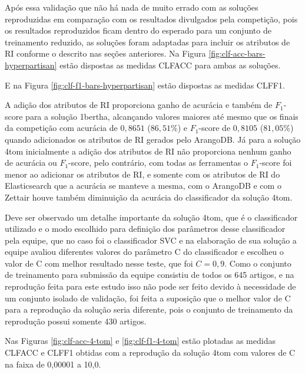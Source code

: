 			

			Após essa validação que não há nada de muito errado com as soluções reproduzidas em comparação com os resultados divulgados pela competição, pois os resultados reproduzidos ficam dentro do esperado para um conjunto de treinamento reduzido, as soluções foram adaptadas para incluir os atributos de RI conforme o descrito nas seções anteriores.
			Na Figura \ref{fig:clf-acc-bars-hyperpartisan} estão dispostas as medidas CLF\underscore{}ACC para ambas as soluções.
			
			

			E na Figura \ref{fig:clf-f1-bars-hyperpartisan} estão dispostas as medidas CLF\underscore{}F1.
			
			

			A adição dos atributos de RI proporciona ganho de acurácia e também de $F_1$-score para a solução 1\underscore{}bertha, alcançando valores maiores até mesmo que os finais da competição com acurácia de $0,8651$ ($86,51\%$) e $F_1$-score de $0,8105$ ($81,05\%$) quando adicionados os atributos de RI gerados pelo ArangoDB.
			Já para a solução 4\underscore{}tom inicialmente a adição dos atributos de RI não proporciona nenhum ganho de acurácia ou $F_1$-score, pelo contrário, com todas as ferramentas o $F_1$-score foi menor ao adicionar os atributos de RI, e somente com os atributos de RI do Elasticsearch que a acurácia se manteve a mesma, com o ArangoDB e com o Zettair houve também diminuição da acurácia do classificador da solução 4\underscore{}tom.

			Deve ser observado um detalhe importante da solução 4\underscore{}tom, que é o classificador utilizado e o modo escolhido para definição dos parâmetros desse classificador pela equipe, que no caso foi o classificador SVC e na elaboração de sua solução a equipe avaliou diferentes valores do parâmetro C do classificador e escolheu o valor de C com melhor resultado nesse teste, que foi $C = 0,9$.
			Como o conjunto de treinamento para submissão da equipe consistiu de todos os 645 artigos, e na reprodução feita para este estudo isso não pode ser feito devido à necessidade de um conjunto isolado de validação, foi feita a suposição que o melhor valor de C para a reprodução da solução seria diferente, pois o conjunto de treinamento da reprodução possui somente 430 artigos.
			
			Nas Figuras \ref{fig:clf-acc-4-tom} e \ref{fig:clf-f1-4-tom} estão plotadas as medidas CLF\underscore{}ACC e CLF\underscore{}F1 obtidas com a reprodução da solução 4\underscore{}tom com valores de C na faixa de 0,00001 a 10,0.
			
